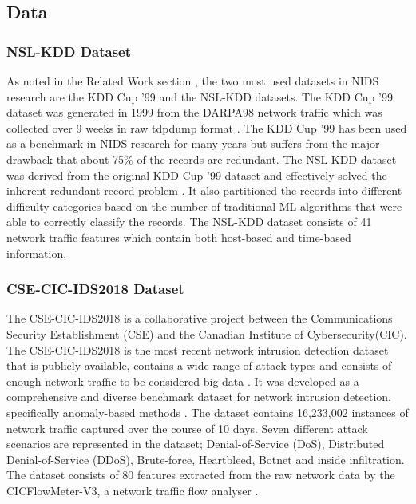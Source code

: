 \documentclass[conference]{IEEEtran}
\begin{document}
\subsection{Data}\label{AA}

\subsubsection{NSL-KDD Dataset}
As noted in the Related Work section , the two most used datasets in NIDS research are the KDD Cup ’99 and the NSL-KDD datasets. The KDD Cup ’99 dataset was generated in 1999 from the DARPA98 network traffic which was collected over 9 weeks in raw tdpdump format \cite{b2}. The KDD Cup ’99 has been used as a benchmark in NIDS research for many years but suffers from the major drawback that about 75\% of the records are redundant. The NSL-KDD dataset was derived from the original KDD Cup ’99 dataset and effectively solved the inherent redundant record problem \cite{b8}. It also partitioned the records into different difficulty categories based on the number of traditional ML algorithms that were able to correctly classify the records.
The NSL-KDD dataset consists of 41 network traffic features which contain both host-based and time-based information.\\

\subsubsection{CSE-CIC-IDS2018 Dataset}
\noindent The CSE-CIC-IDS2018 is a collaborative project between the Communications Security Establishment (CSE) and the Canadian Institute of Cybersecurity(CIC). The CSE-CIC-IDS2018 is the most recent network intrusion detection dataset that is publicly available, contains a wide range of attack types and consists of enough network traffic to be considered big data \cite{b17}. It was developed as a comprehensive and diverse benchmark dataset for network intrusion detection, specifically anomaly-based methods \cite{b16}. The dataset contains 16,233,002 instances of network traffic captured over the course of 10 days. Seven different attack scenarios are represented in the dataset; Denial-of-Service (DoS), Distributed Denial-of-Service (DDoS), Brute-force, Heartbleed, Botnet and inside infiltration. The dataset consists of 80 features extracted from the raw network data by the CICFlowMeter-V3, a network traffic flow analyser \cite{b16}.

\end{document}
